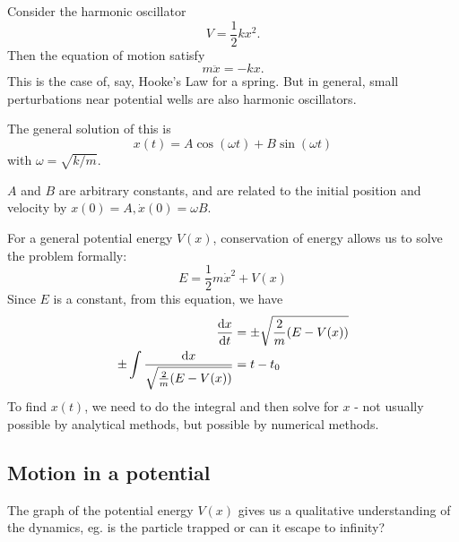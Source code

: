 \documentclass[a4paper]{article}
\begin{document}
\begin{eg}
  Consider the harmonic oscillator
  \[
    V = \frac{1}{2} kx^2.
  \]
  Then the equation of motion satisfy
  \[
    m\ddot{x} = -kx.
  \]
  This is the case of, say, Hooke's Law for a spring. But in general, small perturbations near potential wells are also harmonic oscillators.

  The general solution of this is
  \[
    x(t) = A\cos (\omega t) + B\sin (\omega t)
  \]
  with $\omega = \sqrt{k/m}$.

  $A$ and $B$ are arbitrary constants, and are related to the initial position and velocity by $x(0) = A, \dot{x}(0) = \omega B$.
\end{eg}

For a general potential energy $V(x)$, conservation of energy allows us to solve the problem formally:
\[
  E = \frac{1}{2}m\dot{x}^2 + V(x)
\]
Since $E$ is a constant, from this equation, we have
\begin{align*}
  \frac{\mathrm{d} x}{\mathrm{d} t} &= \pm \sqrt{\frac{2}{m}(E - V(x))}\\
  \pm \int \frac{\mathrm{d} x}{\sqrt{\frac{2}{m}(E - V(x))}} &= t - t_0
\end{align*}
To find $x(t)$, we need to do the integral and then solve for $x$ - not usually possible by analytical methods, but possible by numerical methods.

\subsection{Motion in a potential}
The graph of the potential energy $V(x)$ gives us a qualitative understanding of the dynamics, eg. is the particle trapped or can it escape to infinity?
\end{document}
